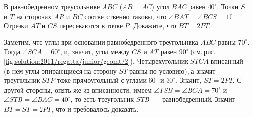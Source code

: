 В равнобедренном треугольнике $ABC$ ($AB = AC$) угол $BAC$ равен $40^\circ$.
Точки $S$ и $T$ на сторонах $AB$ и $BC$ соответственно таковы, что
$\angle BAT = \angle BCS = 10^\circ$.
Отрезки $AT$ и $CS$ пересекаются в точке $P$.
Докажите, что $BT = 2 PT$.

%
\label{solution:2011/regatta/junior/geomt/2}%
Заметим, что углы при основании равнобедренного треугольника $ABC$ равны
$70^\circ$.
Тогда $\angle SCA = 60^\circ$, и, значит, угол между $CS$ и $AT$ равен
$90^\circ$
(см.\,рис.\,\ref{fig:solution:2011/regatta/junior/geomt/2}).
Четырехугольник $STCA$ вписанный
(в нём углы опирающиеся на сторону $ST$ равны по условию),
а значит треугольник $STP$ тоже прямоугольный с углами $60^\circ$ и $30^\circ$.
Значит, $ST = 2 PT$.
С другой стороны, опять же из вписанности, имеем
$\angle TSB = \angle BCA = 70^\circ$ и
$\angle STB = \angle BAC = 40^\circ$,
то есть треугольник $STB$~--- равнобедренный.
Значит $BT = ST = 2 PT$, что и требовалось доказать.


